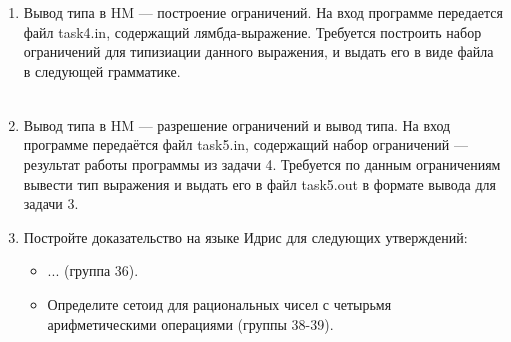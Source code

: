 \documentclass[12pt,a4paper,oneside]{article}
\begin{document}
\begin{enumerate}
\item Вывод типа в HM --- построение ограничений.
На вход программе передается файл task4.in, содержащий лямбда-выражение.
Требуется построить набор ограничений для типизиации данного выражения,
и выдать его в виде файла в следующей грамматике.

\begin{bnf}\begin{eqnarray*}

\end{eqnarray*}\end{bnf}%

\item Вывод типа в HM --- разрешение ограничений и вывод типа.
На вход программе передаётся файл task5.in, содержащий набор ограничений --- результат работы
программы из задачи 4.
Требуется по данным ограничениям вывести тип выражения и выдать его в файл task5.out
в формате вывода для задачи 3.

\item Постройте доказательство на языке Идрис для следующих утверждений:
\begin{itemize}
\item ... (группа 36).
\item Определите сетоид для рациональных чисел с четырьмя арифметическими операциями (группы 38-39).
\end{itemize}

\end{enumerate}
\end{document}
